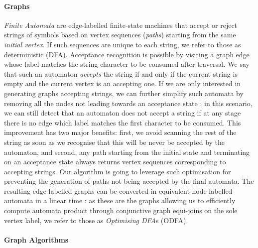 \documentclass[sigconf]{acmart}
\begin{document}


\paragraph*{Graphs} %

\textit{Finite Automata} are edge-labelled finite-state machines that accept or reject strings of symbols based on vertex sequences (\textit{paths}) starting from the same \textit{initial vertex}. If such sequences are unique to each string, we refer to those as deterministic (DFA). Acceptance recognition is possible by visiting a graph edge whose label matches the string character to be consumed after traversal. We say that such an automaton \textit{accepts} the string if and only if the current string is empty and the current vertex is an accepting one. If we are only interested in generating graphs accepting strings, we can further simplify such automata by removing all the nodes not leading towards an acceptance state \cite{DBLP:conf/caise/CiccioBCM15}: in this scenario, we can still detect that an automaton does not accept a string if at any stage there is no edge which label matches the first character to be consumed. This improvement has two major benefits: first, we avoid scanning the rest of the string as soon as we recognise that this will be never be accepted by the automaton, and second, any path starting from the initial state and terminating on an acceptance state always returns vertex sequences corresponding to accepting strings. Our algorithm is going to leverage such optimisation for preventing the generation of paths not being accepted by the final automata. The resulting edge-labelled graphs can be converted in equivalent node-labelled automata in a linear time \cite{DBLP:conf/icpm/BergamiMMP21}: as these are the graphs allowing us to efficiently compute automata product through conjunctive graph equi-joins on the sole vertex label, we refer to those as \textit{Optimising DFA}s (ODFA).


\paragraph*{Graph Algorithms}%
\end{document}

